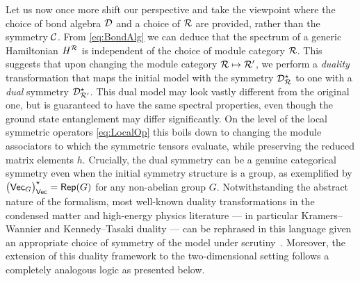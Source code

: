 \bigskip\noindent Let us now once more shift our perspective and take the viewpoint where the choice of bond algebra $\mathcal{D}$ and a choice of $\mathcal{R}$ are provided, rather than the symmetry $\mathcal{C}$. From \cref{eq:BondAlg} we can deduce that the spectrum of a generic Hamiltonian $H^{\mathcal{R}}$ is independent of the choice of module category $\mathcal{R}$. This suggests that upon changing the module category $\mathcal{R}\mapsto\mathcal{R}'$, we perform a \emph{duality} transformation that maps the initial model with the symmetry $\mathcal{D}_{\mathcal{R}}^\star$ to one with a \emph{dual} symmetry $\mathcal{D}_{\mathcal{R}'}^\star$. This dual model may look vastly different from the original one, but is guaranteed to have the same spectral properties, even though the ground state entanglement may differ significantly. On the level of the local symmetric operators \cref{eq:LocalOp} this boils down to changing the module associators to which the symmetric tensors evaluate, while preserving the reduced matrix elements $h$. Crucially, the dual symmetry can be a genuine categorical symmetry even when the initial symmetry structure is a group, as exemplified by $\big(\mathsf{Vec}_G\big) _{\mathsf{Vec}}^\star=\mathsf{Rep}(G)$ for any non-abelian group $G$. Notwithstanding the abstract nature of the formalism, most well-known duality transformations in the condensed matter and high-energy physics literature ---  in particular Kramers–Wannier and Kennedy–Tasaki
duality --- can be rephrased in this language given an appropriate choice of symmetry of the model under scrutiny~\cite{Kramers1941,Kennedy1992,Lootens2021b,Lootens2022,Seifnashri2024,Pace2024,Chatterjee2024}. Moreover, the extension of this duality framework to the two-dimensional setting follows a completely analogous logic as presented below.
